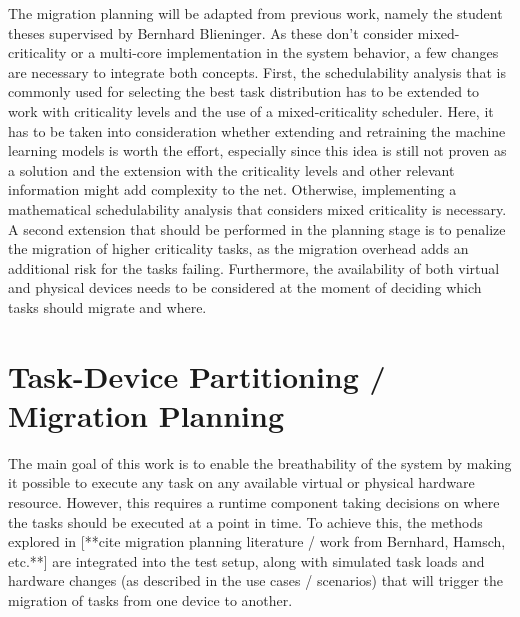 
The migration planning will be adapted from previous work, namely the student theses supervised by Bernhard Blieninger. As these don't consider mixed-criticality or a multi-core implementation in the system behavior, a few changes are necessary to integrate both concepts. First, the schedulability analysis that is commonly used for selecting the best task distribution has to be extended to work with criticality levels and the use of a mixed-criticality scheduler. Here, it has to be taken into consideration whether extending and retraining the machine learning models is worth the effort, especially since this idea is still not proven as a solution and the extension with the criticality levels and other relevant information might add complexity to the net. Otherwise, implementing a mathematical schedulability analysis that considers mixed criticality is necessary. A second extension that should be performed in the planning stage is to penalize the migration of higher criticality tasks, as the migration overhead adds an additional risk for the tasks failing. Furthermore, the availability of both virtual and physical devices needs to be considered at the moment of deciding which tasks should migrate and where.


\section{Task-Device Partitioning / Migration Planning}
The main goal of this work is to enable the breathability of the system by making it possible to execute any task on any available virtual or physical hardware resource. However, this requires a runtime component taking decisions on where the tasks should be executed at a point in time. To achieve this, the methods explored in [**cite migration planning literature / work from Bernhard, Hamsch, etc.**] are integrated into the test setup, along with simulated task loads and hardware changes (as described in the use cases / scenarios) that will trigger the migration of tasks from one device to another. 


